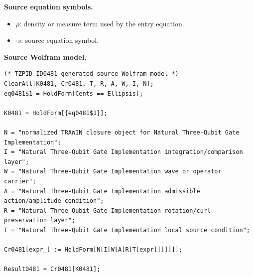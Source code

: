 \begin{minipage}[t]{0.49\linewidth}
\begingroup
\small
\raggedright
\textbf{Source equation symbols.}\par
\begin{itemize}[leftmargin=1.35em,itemsep=1pt,topsep=1pt,parsep=0pt]
    \item $\rho$: density or measure term used by the entry equation.
    \item $\cdot s$: source equation symbol.
\end{itemize}
\endgroup
\end{minipage}\hfill
\begin{minipage}[t]{0.47\linewidth}
\begingroup
\scriptsize
\raggedright
\textbf{Source Wolfram model.}\par
\begin{Verbatim}[fontsize=\tiny,breaklines=true,breakanywhere=true]
(* TZPID ID0481 generated source Wolfram model *)
ClearAll[K0481, Cr0481, T, R, A, W, I, N];
eq0481$1 = HoldForm[Cents == Ellipsis];

K0481 = HoldForm[{eq0481$1}];

N = "normalized TRAWIN closure object for Natural Three-Qubit Gate Implementation";
I = "Natural Three-Qubit Gate Implementation integration/comparison layer";
W = "Natural Three-Qubit Gate Implementation wave or operator carrier";
A = "Natural Three-Qubit Gate Implementation admissible action/amplitude condition";
R = "Natural Three-Qubit Gate Implementation rotation/curl preservation layer";
T = "Natural Three-Qubit Gate Implementation local source condition";

Cr0481[expr_] := HoldForm[N[I[W[A[R[T[expr]]]]]]];

Result0481 = Cr0481[K0481];
\end{Verbatim}
\endgroup
\end{minipage}

